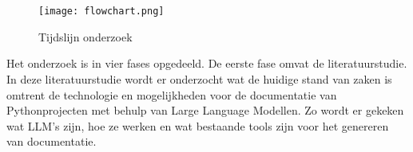 
\chapter{}%
\label{ch:methodologie}

\begin{figure}[h]
    \centering
    \texttt{[image: flowchart.png]}
    \caption{Tijdslijn onderzoek}
    \label{fig:flowchart}
\end{figure}

Het onderzoek is in vier fases opgedeeld. De eerste fase omvat de literatuurstudie.
In deze literatuurstudie wordt er onderzocht wat de huidige stand van zaken is omtrent de technologie en mogelijkheden voor de documentatie van Pythonprojecten met behulp van Large Language Modellen.
Zo wordt er gekeken wat LLM's zijn, hoe ze werken en wat bestaande tools zijn voor het genereren van documentatie.

